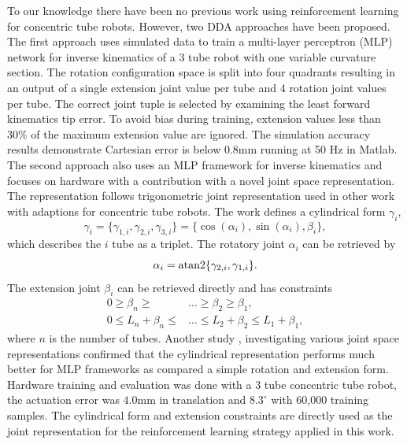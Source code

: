 To our knowledge there have been no previous work using reinforcement learning for concentric tube robots. However, two DDA approaches have been proposed. The first approach \cite{Bergeles2015} uses simulated data to train a multi-layer perceptron (MLP) network for inverse kinematics of a 3 tube robot with one variable curvature section. The rotation configuration space is split into four quadrants resulting in an output of a single extension joint value per tube and 4 rotation joint values per tube. The correct joint tuple is selected by examining the least forward kinematics tip error. To avoid bias during training, extension values less than 30\% of the maximum extension value are ignored. The simulation accuracy results demonstrate Cartesian error is below 0.8mm running at 50 Hz in Matlab. The second approach \cite{Grassmann2018} also uses an MLP framework for inverse kinematics and focuses on hardware with a contribution with a novel joint space representation. The representation follows trigonometric joint representation used in other work with adaptions for concentric tube robots. The work defines a cylindrical form $\gamma_i$,
\begin{equation}
\gamma_i = \{ \gamma_{1,i}, \gamma_{2,i}, \gamma_{3,i} \} = \{ \cos(\alpha_i), \sin(\alpha_i), \beta_i \},\label{eqn:1}
\end{equation}
which describes the $i$ tube as a triplet. The rotatory joint $\alpha_i$ can be retrieved by
\begin{equation}
\alpha_i = \textnormal{atan2} \{ \gamma_{2,i}, \gamma_{1,i} \}. \label{eqn:2}
\end{equation}
The extension joint $\beta_i$ can be retrieved directly and has constraints
\begin{align}
0 \geq \beta_n \geq & \dots \geq \beta_2 \geq \beta_1, \label{eqn:3} \\
0 \leq L_n + \beta_n \leq & \dots \leq L_2 + \beta_2 \leq L_1 + \beta_1, \label{eqn:4}
\end{align}
where $n$ is the number of tubes. Another study \cite{Grassmann2019}, investigating various joint space representations confirmed that the cylindrical representation performs much better for MLP frameworks as compared a simple rotation and extension form. Hardware training and evaluation was done with a 3 tube concentric tube robot, the actuation error was $4.0$mm in translation and $8.3 ^{\circ}$ with 60,000 training samples. The cylindrical form and extension constraints are directly used as the joint representation for the reinforcement learning strategy applied in this work.

